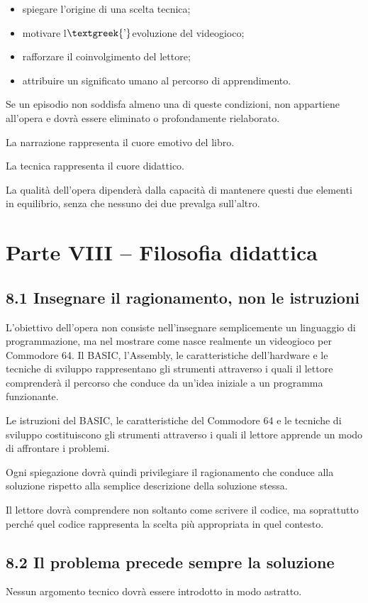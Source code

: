 \documentclass{article}
\begin{document}
\begin{itemize}
\item spiegare l'origine di una scelta tecnica;
\item motivare l$\text{\textgreek{’}}$evoluzione del videogioco;
\item rafforzare il coinvolgimento del lettore;
\item attribuire un significato umano al percorso di apprendimento.
\end{itemize}
Se un episodio non soddisfa almeno una di queste condizioni, non appartiene all'opera e dovrà essere eliminato o
profondamente rielaborato.

La narrazione rappresenta il cuore emotivo del libro.

La tecnica rappresenta il cuore didattico.

La qualità dell'opera dipenderà dalla capacità di mantenere questi due elementi in equilibrio, senza che nessuno dei due
prevalga sull'altro.

\section{Parte VIII – Filosofia didattica}
\subsection{8.1 Insegnare il ragionamento, non le istruzioni}
L'obiettivo dell'opera non consiste nell'insegnare semplicemente un linguaggio di programmazione, ma nel mostrare come
nasce realmente un videogioco per Commodore 64. Il BASIC, l'Assembly, le caratteristiche dell'hardware e le tecniche di
sviluppo rappresentano gli strumenti attraverso i quali il lettore comprenderà il percorso che conduce da un'idea
iniziale a un programma funzionante.

Le istruzioni del BASIC, le caratteristiche del Commodore 64 e le tecniche di sviluppo costituiscono gli strumenti
attraverso i quali il lettore apprende un modo di affrontare i problemi.

Ogni spiegazione dovrà quindi privilegiare il ragionamento che conduce alla soluzione rispetto alla semplice descrizione
della soluzione stessa.

Il lettore dovrà comprendere non soltanto come scrivere il codice, ma soprattutto perché quel codice rappresenta la
scelta più appropriata in quel contesto.

\subsection{8.2 Il problema precede sempre la soluzione}
Nessun argomento tecnico dovrà essere introdotto in modo astratto.
\end{document}
